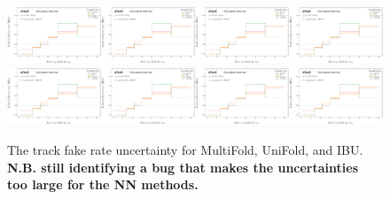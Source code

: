 \begin{figure}[h!]
\includegraphics[width=0.25\textwidth,page=11]{figures/SimResults/TrackJet_SystEffect.pdf}\includegraphics[width=0.25\textwidth,page=15]{figures/SimResults/TrackJet_SystEffect.pdf}\includegraphics[width=0.25\textwidth,page=43]{figures/SimResults/TrackJet_SystEffect.pdf}\includegraphics[width=0.25\textwidth,page=47]{figures/SimResults/TrackJet_SystEffect.pdf}\\
\includegraphics[width=0.25\textwidth,page=51]{figures/SimResults/TrackJet_SystEffect.pdf}\includegraphics[width=0.25\textwidth,page=55]{figures/SimResults/TrackJet_SystEffect.pdf}\includegraphics[width=0.25\textwidth,page=59]{figures/SimResults/TrackJet_SystEffect.pdf}\includegraphics[width=0.25\textwidth,page=63]{figures/SimResults/TrackJet_SystEffect.pdf}
\caption{The track fake rate uncertainty for MultiFold, UniFold, and IBU.  \textbf{N.B. still identifying a bug that makes the uncertainties too large for the NN methods.}}
\label{fig:simresultsmulti_trackjetuncertsl3}
\end{figure}

